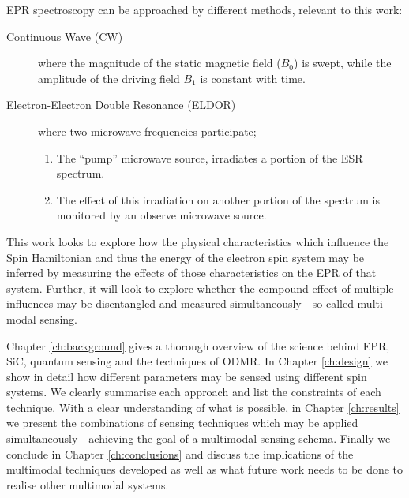 EPR spectroscopy can be approached by different methods, relevant to this work:
\begin{description}
	\item [Continuous Wave (CW)] where the magnitude of the static magnetic field ($B_0$) is swept, while the
	      amplitude of the driving field $B_1$ is constant with time.


    \item[Electron-Electron Double Resonance (ELDOR)] where two microwave frequencies participate;
        \begin{enumerate}
            \item The “pump” microwave source, irradiates a portion of the ESR spectrum. 
            \item The effect of this irradiation on another portion of the spectrum is monitored by an observe microwave source. \cite{Berliner2011-ww}


        \end{enumerate}
\end{description}

This work looks to explore how the physical characteristics which influence the Spin Hamiltonian and thus the energy of the electron spin system may be inferred by measuring the effects of those characteristics on the EPR of that system. Further, it will look to explore whether the compound effect of multiple influences may be disentangled and measured simultaneously - so called multi-modal sensing.

Chapter \ref{ch:background} gives a thorough overview of the science behind EPR, SiC, quantum sensing and the techniques of ODMR. 
In Chapter \ref{ch:design} we show in detail how different parameters may be sensed using different spin systems. We clearly summarise each approach and list the constraints of each technique. With a clear understanding of what is possible, in Chapter \ref{ch:results} we present the combinations of sensing techniques which may be applied simultaneously - achieving the goal of a multimodal sensing schema. Finally we conclude in Chapter \ref{ch:conclusions} and discuss the implications of the multimodal techniques developed as well as what future work needs to be done to realise other multimodal systems.  


